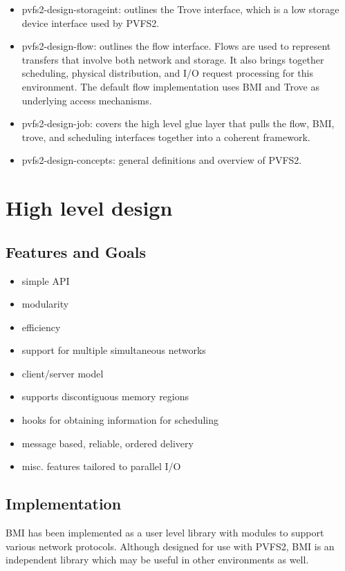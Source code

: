 \documentclass[11pt]{article}
\begin{document}
\begin{itemize}
\item pvfs2-design-storageint: outlines the Trove interface, which
is a low storage device interface used by PVFS2.  
\item pvfs2-design-flow: outlines the flow interface.  Flows are
used to represent transfers that involve both network and storage.
It also brings together scheduling, physical distribution, and I/O request
processing for this environment.  The default flow implementation
uses BMI and Trove as underlying access mechanisms.
\item pvfs2-design-job: covers the high level glue layer that
pulls the flow, BMI, trove, and scheduling interfaces together
into a coherent framework.
\item pvfs2-design-concepts: general definitions and overview of
PVFS2.
\end{itemize}

\section{High level design}
\label{sec:high}

\subsection{Features and Goals}

\begin{itemize}
\item simple API
\item modularity
\item efficiency
\item support for multiple simultaneous networks
\item client/server model
\item supports discontiguous memory regions
\item hooks for obtaining information for scheduling
\item message based, reliable, ordered delivery
\item misc. features tailored to parallel I/O
\end{itemize}

\subsection{Implementation}

BMI has been implemented as a user level library with 
modules to support various network protocols.  Although designed for use
with PVFS2, BMI is an independent library which may be useful in other
environments as well.
\end{document}
